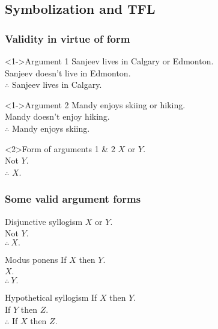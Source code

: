 \subsection{Symbolization and TFL}

\begin{frame}
  \frametitle{Validity in virtue of form}

  \begin{block}<1->{Argument 1}
  Sanjeev lives in Calgary or Edmonton.\\
  Sanjeev doesn't live in Edmonton.\\
  $\therefore$ Sanjeev lives in Calgary.
  \end{block}

  \begin{block}<1->{Argument 2}
  Mandy enjoys skiing or hiking.\\
  Mandy doesn't enjoy hiking.\\
  $\therefore$ Mandy enjoys skiing.
  \end{block}

  \begin{block}<2>{Form of arguments 1 \& 2}
  $X$ or $Y$.\\
  Not $Y$.\\
  $\therefore$ $X$.
  \end{block}

\end{frame}

\begin{frame}
  \frametitle{Some valid argument forms}

  \begin{block}{Disjunctive syllogism}
  $X$ or $Y$.\\
  Not $Y$.\\
  $\therefore\ X.$
  \end{block}

  \begin{block}{Modus ponens}
  If $X$ then $Y$.\\
  $X$.\\
  $\therefore\ Y.$
  \end{block}

  \begin{block}{Hypothetical syllogism}
  If $X$ then $Y$.\\
  If $Y$ then $Z$.\\
  $\therefore$ If $X$ then $Z$.
  \end{block}
\end{frame}

